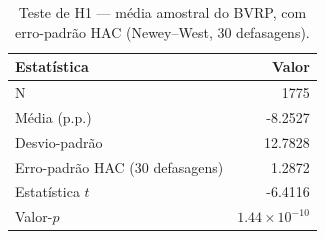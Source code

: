 \begin{table}[H]
\centering
\caption{Teste de H1 --- média amostral do BVRP, com erro-padrão HAC (Newey--West, 30 defasagens).}
\label{tab:cap5-h1-teste-media}
\begin{tabular}{lr}
\toprule
Estatística & Valor \\
\midrule
N & 1775 \\
Média (p.p.) & -8.2527 \\
Desvio-padrão & 12.7828 \\
Erro-padrão HAC (30 defasagens) & 1.2872 \\
Estatística $t$ & -6.4116 \\
Valor-$p$ & $1.44 \times 10^{-10}$ \\
\bottomrule
\end{tabular}
\end{table}
